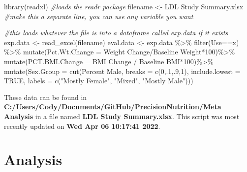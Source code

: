 \documentclass[
]{article}
\newenvironment{Shaded}{\begin{snugshade}}{\end{snugshade}}
\newcommand{\AttributeTok}[1]{\textcolor[rgb]{0.77,0.63,0.00}{#1}}
\newcommand{\CommentTok}[1]{\textcolor[rgb]{0.56,0.35,0.01}{\textit{#1}}}
\newcommand{\ConstantTok}[1]{\textcolor[rgb]{0.00,0.00,0.00}{#1}}
\newcommand{\DecValTok}[1]{\textcolor[rgb]{0.00,0.00,0.81}{#1}}
\newcommand{\FunctionTok}[1]{\textcolor[rgb]{0.00,0.00,0.00}{#1}}
\newcommand{\NormalTok}[1]{#1}
\newcommand{\OtherTok}[1]{\textcolor[rgb]{0.56,0.35,0.01}{#1}}
\newcommand{\SpecialCharTok}[1]{\textcolor[rgb]{0.00,0.00,0.00}{#1}}
\newcommand{\StringTok}[1]{\textcolor[rgb]{0.31,0.60,0.02}{#1}}
\begin{document}
\begin{Shaded}
\begin{Highlighting}[]
\FunctionTok{library}\NormalTok{(readxl) }\CommentTok{\#loads the readr package}
\NormalTok{filename }\OtherTok{\textless{}{-}} \StringTok{\textquotesingle{}LDL Study Summary.xlsx\textquotesingle{}} \CommentTok{\#make this a separate line, you can use any variable you want}

\CommentTok{\#this loads whatever the file is into a dataframe called exp.data if it exists}
\NormalTok{exp.data }\OtherTok{\textless{}{-}} \FunctionTok{read\_excel}\NormalTok{(filename)}
\NormalTok{eval.data }\OtherTok{\textless{}{-}}\NormalTok{ exp.data }\SpecialCharTok{\%\textgreater{}\%} 
  \FunctionTok{filter}\NormalTok{(Use}\SpecialCharTok{==}\StringTok{\textquotesingle{}x\textquotesingle{}}\NormalTok{) }\SpecialCharTok{\%\textgreater{}\%}
  \FunctionTok{mutate}\NormalTok{(}\AttributeTok{Pct.Wt.Change =} \StringTok{\textasciigrave{}}\AttributeTok{Weight Change}\StringTok{\textasciigrave{}}\SpecialCharTok{/}\StringTok{\textasciigrave{}}\AttributeTok{Baseline Weight}\StringTok{\textasciigrave{}}\SpecialCharTok{*}\DecValTok{100}\NormalTok{)}\SpecialCharTok{\%\textgreater{}\%}
  \FunctionTok{mutate}\NormalTok{(}\AttributeTok{PCT.BMI.Change =} \StringTok{\textasciigrave{}}\AttributeTok{BMI Change}\StringTok{\textasciigrave{}} \SpecialCharTok{/} \StringTok{\textasciigrave{}}\AttributeTok{Baseline BMI}\StringTok{\textasciigrave{}}\SpecialCharTok{*}\DecValTok{100}\NormalTok{)}\SpecialCharTok{\%\textgreater{}\%}
  \FunctionTok{mutate}\NormalTok{(}\AttributeTok{Sex.Group =} \FunctionTok{cut}\NormalTok{(}\StringTok{\textasciigrave{}}\AttributeTok{Percent Male}\StringTok{\textasciigrave{}}\NormalTok{, }\AttributeTok{breaks =} \FunctionTok{c}\NormalTok{(}\DecValTok{0}\NormalTok{,.}\DecValTok{1}\NormalTok{,.}\DecValTok{9}\NormalTok{,}\DecValTok{1}\NormalTok{), }\AttributeTok{include.lowest =} \ConstantTok{TRUE}\NormalTok{, }\AttributeTok{labels =} \FunctionTok{c}\NormalTok{(}\StringTok{"Mostly Female"}\NormalTok{, }\StringTok{"Mixed"}\NormalTok{, }\StringTok{"Mostly Male"}\NormalTok{)))}
\end{Highlighting}
\end{Shaded}

These data can be found in
\textbf{C:/Users/Cody/Documents/GitHub/PrecisionNutrition/Meta Analysis}
in a file named \textbf{LDL Study Summary.xlsx}. This script was most
recently updated on \textbf{Wed Apr 06 10:17:41 2022}.

\hypertarget{analysis}{%
\section{Analysis}\label{analysis}}
\end{document}

